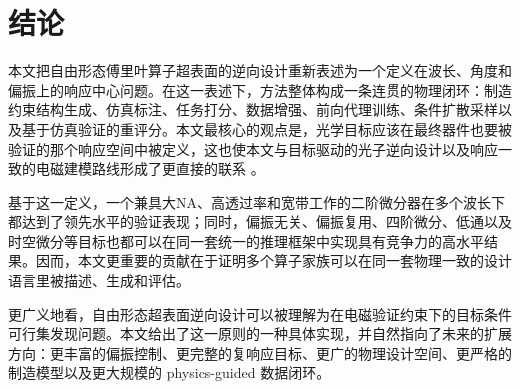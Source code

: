 \section{结论}

本文把自由形态傅里叶算子超表面的逆向设计重新表述为一个定义在波长、角度和偏振上的响应中心问题。在这一表述下，方法整体构成一条连贯的物理闭环：制造约束结构生成、仿真标注、任务打分、数据增强、前向代理训练、条件扩散采样以及基于仿真验证的重评分。本文最核心的观点是，光学目标应该在最终器件也要被验证的那个响应空间中被定义，这也使本文与目标驱动的光子逆向设计以及响应一致的电磁建模路线形成了更直接的联系 \cite{an2019deep,ma2019probabilistic,phillips2021ensemble}。

基于这一定义，一个兼具大NA、高透过率和宽带工作的二阶微分器在多个波长下都达到了领先水平的验证表现；同时，偏振无关、偏振复用、四阶微分、低通以及时空微分等目标也都可以在同一套统一的推理框架中实现具有竞争力的高水平结果。因而，本文更重要的贡献在于证明多个算子家族可以在同一套物理一致的设计语言里被描述、生成和评估。

更广义地看，自由形态超表面逆向设计可以被理解为在电磁验证约束下的目标条件可行集发现问题。本文给出了这一原则的一种具体实现，并自然指向了未来的扩展方向：更丰富的偏振控制、更完整的复响应目标、更广的物理设计空间、更严格的制造模型以及更大规模的 physics-guided 数据闭环。

